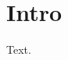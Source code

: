 \documentclass{memoir}
\begin{document}
\tableofcontents
{\KeepFromToc\listoftables}
\listofexamples
\chapter{Intro}
Text.
\begin{table}\caption{A table}\end{table}
\end{document}
